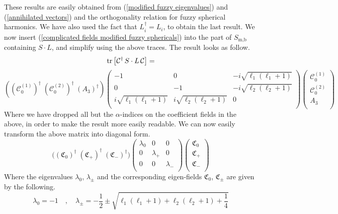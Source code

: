 %
%
These results are easily obtained from (\ref{modified fuzzy eigenvalues}) and (\ref{annihilated vectors}) and the orthogonality relation for fuzzy spherical harmonics. We have also used the fact that $L_i^\dagger = L_i$, to obtain the last result. We now insert (\ref{complicated fields modified fuzzy sphericals}) into the part of $S_{\text{m,b}}$ containing $S \cdot L$, and simplify using the above traces. The result looks as follow.
%
%
\begin{equation*}
\tr \left[
\mathcal{C}^\dagger \, S \cdot L \, \mathcal{C}
\right]
=
\end{equation*}
%
%
\begin{equation}
\left( 
(\mathcal{C}_0^{(1)})^\dagger \;
(\mathcal{C}_0^{(2)})^\dagger \;
(A_3)^\dagger
\right)
\left(\begin{array}{ccc}
-1 & 0 & -i \sqrt{\ell_1 (\ell_1 + 1)} \\
0 & -1 & -i \sqrt{\ell_2 (\ell_2 + 1)} \\
i \sqrt{\ell_1 (\ell_1 + 1)} & i \sqrt{\ell_2 (\ell_2 + 1)} & 0 \\
\end{array} \right)
\left(\begin{array}{c}
\mathcal{C}_0^{(1)} \\
\mathcal{C}_0^{(2)} \\
A_3 \\
\end{array} \right)
\end{equation}
%
%
Where we have dropped all but the $\alpha$-indices on the coefficient fields in the above, in order to make the result more easily readable. We can now easily transform the above matrix into diagonal form. 
%
%
\begin{equation}\label{residual 3x3 matrix}
\Big( 
(\mathfrak{C}_0)^\dagger \;
(\mathfrak{C}_{+})^\dagger \;
(\mathfrak{C}_{-})^\dagger
\Big)
\left(\begin{array}{ccc}
\lambda_0 & 0 & 0 \\
0 & \lambda_{+} & 0 \\
0 & 0 & \lambda_{-} \\
\end{array} \right)
\left(\begin{array}{c}
\mathfrak{C}_0 \\
\mathfrak{C}_{+} \\
\mathfrak{C}_{-} \\
\end{array} \right)
\end{equation}
%
%
Where the eigenvalues $\lambda_0$, $\lambda_{\pm}$ and the corresponding eigen-fields $\mathfrak{C}_0$, $\mathfrak{C}_{\pm}$ are given by the following.
%
%
\begin{equation}
\lambda_0 = -1
%
\quad , \quad
%
\lambda_{\pm}
=
-\frac{1}{2} \pm \sqrt{\ell_1 (\ell_1 + 1) + \ell_2 (\ell_2 + 1) + \frac{1}{4}}
\end{equation}
%
%

